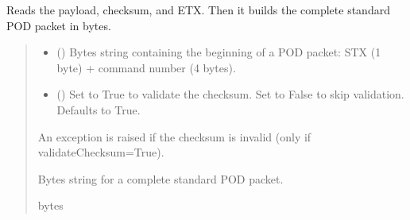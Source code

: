 \documentclass[letterpaper,10pt,english]{sphinxmanual}
\begin{document}
\begin{fulllineitems}
\begin{fulllineitems}
\end{fulllineitems}


\begin{fulllineitems}
\label{\detokenize{BasicPodProtocol:BasicPodProtocol.POD_Basics._Read_Standard}}
\pysigstartsignatures
{}
\pysigstopsignatures
\sphinxAtStartPar
Reads the payload, checksum, and ETX. Then it builds the complete standard POD packet in bytes.
\begin{quote}\begin{description}
\begin{itemize}
\item {} 
\sphinxAtStartPar
{} () \textendash{} Bytes string containing the beginning of a POD packet: STX (1 byte)                 + command number (4 bytes).

\item {} 
\sphinxAtStartPar
{} (\sphinxstyleliteralemphasis{\sphinxupquote{, }}) \textendash{} Set to True to validate the checksum. Set to False to                 skip validation. Defaults to True.

\end{itemize}

\sphinxAtStartPar
{} \textendash{} An exception is raised if the checksum is invalid (only if validateChecksum=True).

\sphinxAtStartPar
Bytes string for a complete standard POD packet.

\sphinxAtStartPar
bytes

\end{description}\end{quote}


\end{fulllineitems}
\end{fulllineitems}
\end{document}
